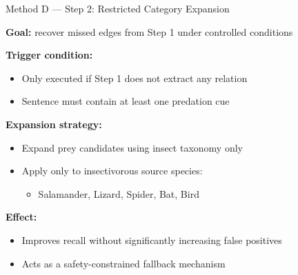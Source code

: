 \documentclass[aspectratio=169,11pt]{beamer}
\begin{document}
\begin{frame}{Method D --- Step 2: Restricted Category Expansion}

\small

\textbf{Goal:} recover missed edges from Step 1 under controlled conditions

\vspace{0.4em}

\textbf{Trigger condition:}
\begin{itemize}
    \item Only executed if Step 1 does not extract any relation
    \item Sentence must contain at least one predation cue
\end{itemize}

\vspace{0.4em}

\textbf{Expansion strategy:}
\begin{itemize}
    \item Expand prey candidates using insect taxonomy only
    \item Apply only to insectivorous source species:
    \begin{itemize}
        \item Salamander, Lizard, Spider, Bat, Bird
    \end{itemize}
\end{itemize}

\vspace{0.4em}

\textbf{Effect:}
\begin{itemize}
    \item Improves recall without significantly increasing false positives
    \item Acts as a safety-constrained fallback mechanism
\end{itemize}

\end{frame}
\end{document}
